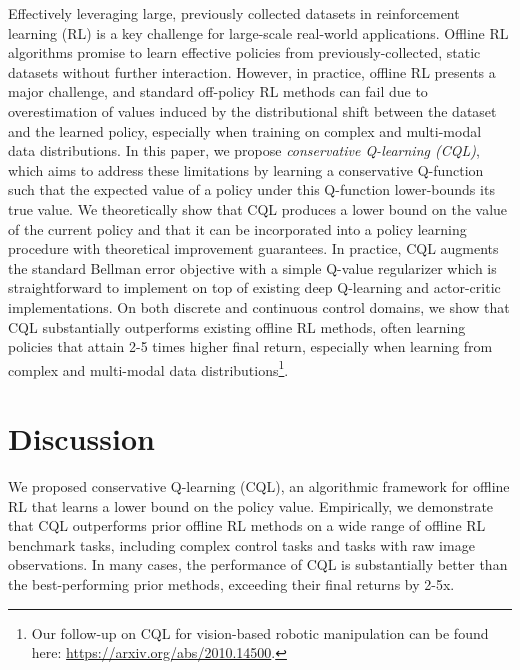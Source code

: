 \documentclass[../thesis.tex]{subfiles}
\begin{document}


Effectively leveraging large, previously collected datasets in reinforcement learning (RL) is a key challenge for large-scale real-world applications. Offline RL algorithms promise to learn effective policies from previously-collected, static datasets without further interaction. However, in practice, offline RL presents a major challenge, and standard off-policy RL methods can fail due to overestimation of values induced by the distributional shift between the dataset and the learned policy, especially when training on complex and multi-modal data distributions. In this paper, we propose \emph{conservative Q-learning (CQL)}, which aims to address these limitations by learning a conservative Q-function such that the expected value of a policy under this Q-function lower-bounds its true value. We theoretically show that CQL produces a lower bound on the value of the current policy and that it can be incorporated into a policy learning procedure with theoretical improvement guarantees. In practice, CQL augments the standard Bellman error objective with a simple Q-value regularizer which is straightforward to implement on top of existing deep Q-learning and actor-critic implementations. On both discrete and continuous control domains, we show that CQL substantially outperforms existing offline RL methods, often learning policies that attain 2-5 times higher final return, especially when learning from complex and multi-modal data distributions\footnote{Our follow-up on CQL for vision-based robotic manipulation can be found here: \url{https://arxiv.org/abs/2010.14500}.}.













\section{Discussion}
We proposed conservative Q-learning (CQL), an algorithmic framework for offline RL that learns a lower bound on the policy value.
Empirically, we demonstrate that CQL outperforms prior offline RL methods on a wide range of offline RL benchmark tasks, including complex control tasks and tasks with raw image observations. In many cases, the performance of CQL is substantially better than the best-performing prior methods, exceeding their final returns by 2-5x.
\end{document}
